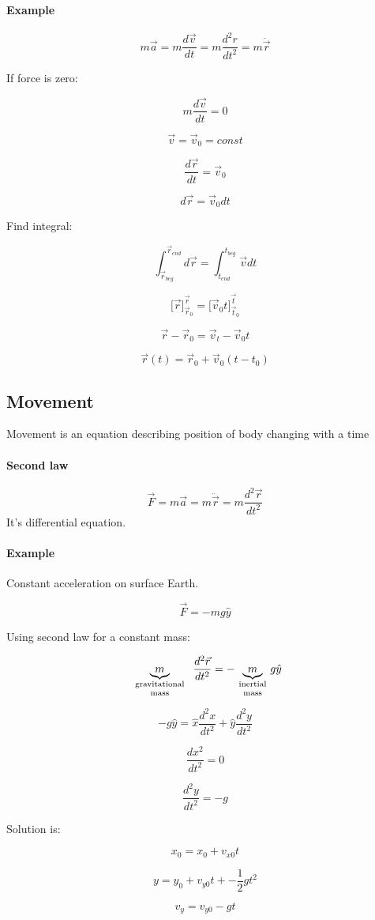 \paragraph{Example}

$$m\vec{a} = m\frac{d\vec{v}}{dt} = m \frac{d^2r}{dt^2} = m \ddot{\vec{r}}$$

If force is zero:

$$m\frac{d\vec{v}}{dt} = 0 $$

$$\vec{v} = \vec{v}_0 =const $$

$$\frac{d\vec{r}}{dt} = \vec{v}_0 $$

$$d\vec{r} = \vec{v}_0 dt$$

Find integral:

$$\int_{\vec{r}_{beg}}^{\vec{r}_{end}} d\vec{r} = \int_{t_{end}}^{t_{beg}} \vec{v} dt$$

$$\bigg[ \vec{r} \bigg]_{\vec{r}_0}^{\vec{r}} = \bigg[ \vec{v}_0 t \bigg]_{\vec{t}_0}^{\vec{t}}$$

$$\vec{r} - \vec{r}_0 = \vec{v}_t - \vec{v}_0t$$

$$\vec{r}(t) = \vec{r}_0 + \vec{v}_0\left( t-t_0 \right)$$

\subsection{Movement}
Movement is an equation describing position of body changing with a time
\paragraph{Second law} $$\vec{F} = m \vec{a} = m \ddot{\vec{r}} = m \frac{d^2 \vec{r}}{d t^2}$$ It's differential equation.

\paragraph{Example} Constant acceleration on surface Earth.

$$\vec{F} = - mg \hat{y}$$

Using second law for a constant mass:

$$\underbrace{m}_{\parbox{2cm}{\scriptsize  \centering gravitational\\ mass}} \frac{d^2 \vec{r}}{dt^2} = -\underbrace{m}_{\parbox{1cm}{\scriptsize  \centering inertial\\ mass}}g \hat{y}$$

$$-g\hat{y} = \hat{x} \frac{d^2x}{dt^2} + \hat{y}\frac{d^2y}{dt^2}$$

$$\frac{dx^2}{dt^2} = 0$$

$$\frac{d^2y}{dt^2}=-g$$

Solution is:

$$x_0 = x_0 + v_{x0}t$$

$$y= y_0 + v_{y0}t +- \frac{1}{2}gt^2$$

$$v_y = v_{y0} -gt$$